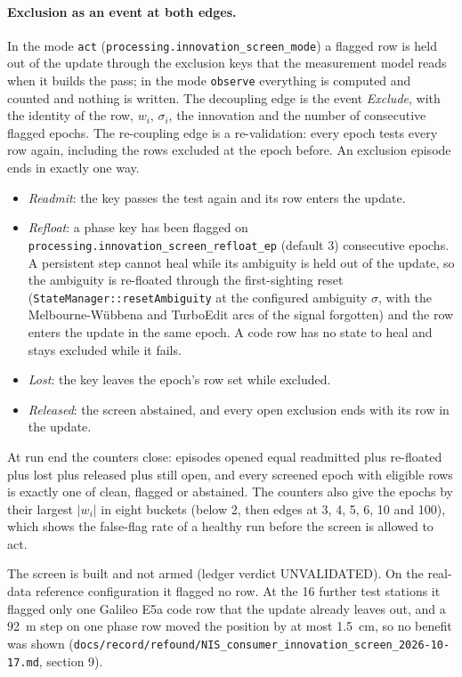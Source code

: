\documentclass[main.tex]{subfiles}
\begin{document}
\paragraph{Exclusion as an event at both edges.}
In the mode \texttt{act} (\texttt{processing.innovation\_screen\_mode}) a
flagged row is held out of the update through the exclusion keys that the
measurement model reads when it builds the pass; in the mode \texttt{observe}
everything is computed and counted and nothing is written.  The decoupling edge
is the event \emph{Exclude}, with the identity of the row, $w_i$, $\sigma_i$,
the innovation and the number of consecutive flagged epochs.  The re-coupling
edge is a re-validation: every epoch tests every row again, including the rows
excluded at the epoch before.  An exclusion episode ends in exactly one way.
\begin{itemize}[leftmargin=*, itemsep=0pt]
\item \emph{Readmit}: the key passes the test again and its row enters the
      update.
\item \emph{Refloat}: a phase key has been flagged on
      \texttt{processing.innovation\_screen\_refloat\_ep} (default $3$)
      consecutive epochs.  A persistent step cannot heal while its ambiguity is
      held out of the update, so the ambiguity is re-floated through the
      first-sighting reset (\texttt{StateManager::resetAmbiguity} at the
      configured ambiguity $\sigma$, with the Melbourne-W\"ubbena and TurboEdit
      arcs of the signal forgotten) and the row enters the update in the same
      epoch.  A code row has no state to heal and stays excluded while it
      fails.
\item \emph{Lost}: the key leaves the epoch's row set while excluded.
\item \emph{Released}: the screen abstained, and every open exclusion ends with
      its row in the update.
\end{itemize}
At run end the counters close: episodes opened equal readmitted plus re-floated
plus lost plus released plus still open, and every screened epoch with eligible
rows is exactly one of clean, flagged or abstained.  The counters also give the
epochs by their largest $|w_i|$ in eight buckets (below 2, then edges at 3, 4, 5,
6, 10 and 100), which shows the false-flag rate of a healthy run before the
screen is allowed to act.

The screen is built and not armed (ledger verdict UNVALIDATED).  On the
real-data reference configuration it flagged no row.  At the 16 further test
stations it flagged only one Galileo E5a code row that the update already leaves
out, and a \SI{92}{\metre} step on one phase row moved the position by at most
\SI{1.5}{\centi\metre}, so no benefit was shown
(\texttt{docs/record/refound/NIS\_consumer\_innovation\_screen\_2026-10-17.md},
section 9).
\end{document}
